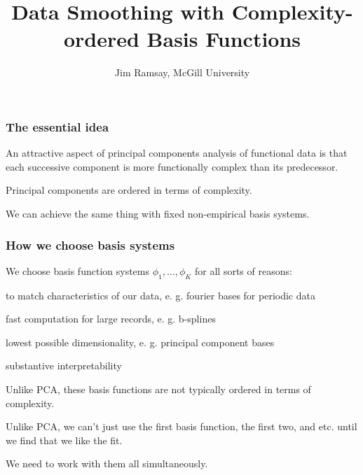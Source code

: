 \documentclass[11pt]{beamer}
\title{Data Smoothing with Complexity-ordered Basis Functions}
\author{Jim Ramsay, McGill University}
\date{}
\begin{document}
\begin{frame}

\maketitle

\end{frame}


\begin{frame}

\frametitle{The essential idea}

\bi
  \item An attractive aspect of principal components analysis of functional data is that each successive
  component is more functionally complex than its predecessor.
  \item Principal components are ordered in terms of complexity.
  \item We can achieve the same thing with fixed non-empirical basis systems.
\ei

\end{frame}


\begin{frame}

\frametitle{How we choose basis systems}

\bi
  \item We choose basis function systems $\phi_1, \ldots, \phi_K$ for all sorts of reasons:
  \bi
    \item to match characteristics of our data, e. g. fourier bases for periodic data
    \item fast computation for large records, e. g. b-splines
    \item lowest possible dimensionality, e. g. principal component bases
    \item substantive interpretability
  \ei
  \item Unlike PCA, these basis functions are not typically ordered in terms of complexity.
  \item Unlike PCA, we can't just use the first basis function, the first two, and etc. until we find that we like the fit.
  \item We need to work with them all simultaneously.
\ei

\end{frame}
\end{document}
